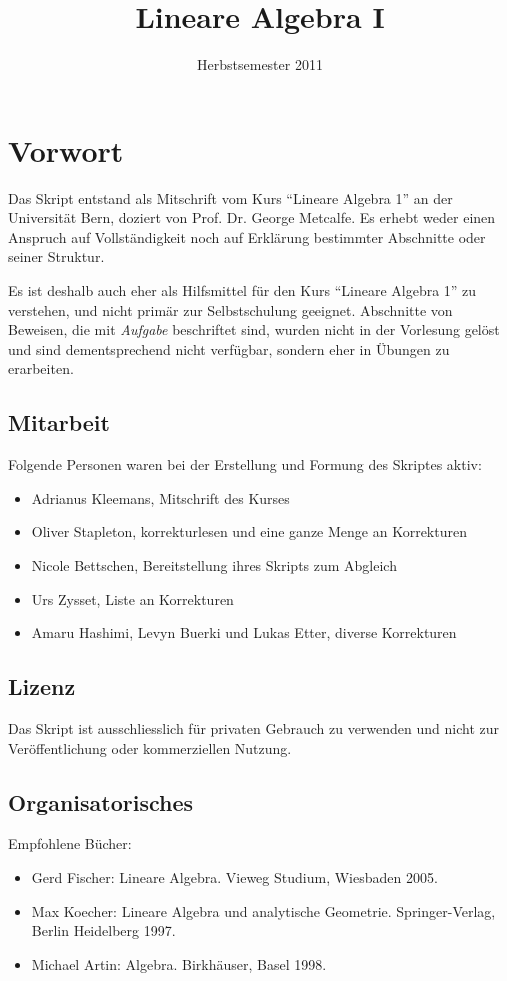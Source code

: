 \documentclass[11pt]{report}
\title{Lineare Algebra I}
\date{Herbstsemester 2011}
\author{ }
\begin{document}
\maketitle
\tableofcontents
\newpage

\section{Vorwort}
Das Skript entstand als Mitschrift vom Kurs ``Lineare Algebra 1'' an der Universität Bern, doziert von Prof. Dr. George Metcalfe. Es erhebt weder einen Anspruch auf Vollständigkeit noch auf Erklärung bestimmter Abschnitte oder seiner Struktur.

Es ist deshalb auch eher als Hilfsmittel für den Kurs ``Lineare Algebra 1'' zu verstehen, und nicht primär zur Selbstschulung geeignet. Abschnitte von Beweisen, die mit \textit{Aufgabe} beschriftet sind, wurden nicht in der Vorlesung gelöst und sind dementsprechend nicht verfügbar, sondern eher in Übungen zu erarbeiten.

\subsection{Mitarbeit}
Folgende Personen waren bei der Erstellung und Formung des Skriptes aktiv:
\begin{itemize}
 \item Adrianus Kleemans, Mitschrift des Kurses
 \item Oliver Stapleton, korrekturlesen und eine ganze Menge an Korrekturen
 \item Nicole Bettschen, Bereitstellung ihres Skripts zum Abgleich
 \item Urs Zysset, Liste an Korrekturen
 \item Amaru Hashimi, Levyn Buerki und Lukas Etter, diverse Korrekturen
\end{itemize}

\subsection{Lizenz}
Das Skript ist ausschliesslich für privaten Gebrauch zu verwenden und nicht zur Veröffentlichung oder kommerziellen Nutzung.

\subsection{Organisatorisches}
Empfohlene Bücher:
\begin{itemize}
\item Gerd Fischer: Lineare Algebra. Vieweg Studium, Wiesbaden 2005.
\item Max Koecher: Lineare Algebra und analytische Geometrie. Springer-Verlag, Berlin Heidelberg 1997.
\item Michael Artin: Algebra. Birkhäuser, Basel 1998.
\end{itemize}
\end{document}

